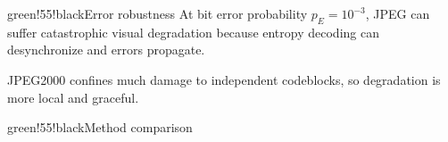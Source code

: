 \begin{calloutbox}{green!55!black}{Error robustness}
At bit error probability $p_E=10^{-3}$, JPEG can suffer catastrophic visual degradation because entropy decoding can desynchronize and errors propagate.

JPEG2000 confines much damage to independent codeblocks, so degradation is more local and graceful.
\end{calloutbox}

\begin{calloutbox}{green!55!black}{Method comparison}
\begin{center}
\end{center}
\end{calloutbox}
